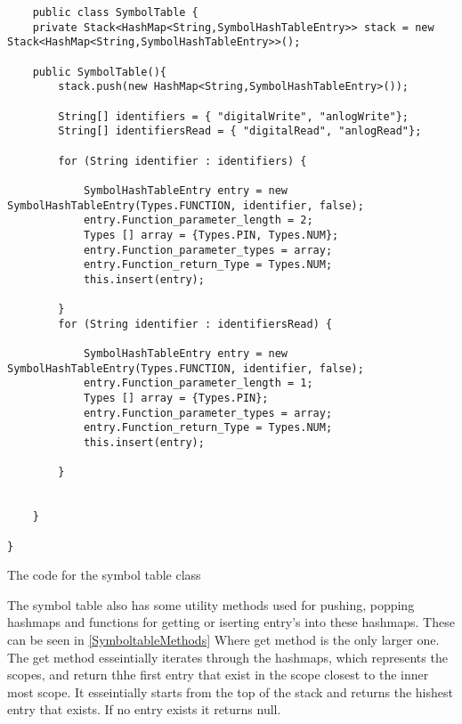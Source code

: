 \begin{listing}[htb!]
    \begin{verbatim}
    public class SymbolTable {
    private Stack<HashMap<String,SymbolHashTableEntry>> stack = new Stack<HashMap<String,SymbolHashTableEntry>>();
    
    public SymbolTable(){
        stack.push(new HashMap<String,SymbolHashTableEntry>());
        
        String[] identifiers = { "digitalWrite", "anlogWrite"};
        String[] identifiersRead = { "digitalRead", "anlogRead"};

        for (String identifier : identifiers) {
            
            SymbolHashTableEntry entry = new SymbolHashTableEntry(Types.FUNCTION, identifier, false);
            entry.Function_parameter_length = 2;
            Types [] array = {Types.PIN, Types.NUM};
            entry.Function_parameter_types = array;
            entry.Function_return_Type = Types.NUM;
            this.insert(entry);
            
        }
        for (String identifier : identifiersRead) {
            
            SymbolHashTableEntry entry = new SymbolHashTableEntry(Types.FUNCTION, identifier, false);
            entry.Function_parameter_length = 1;
            Types [] array = {Types.PIN};
            entry.Function_parameter_types = array;
            entry.Function_return_Type = Types.NUM;
            this.insert(entry);
            
        }


    }

}
\end{verbatim}
\caption{The code for the symbol table class}
\label{lst:SymbolTable}
\end{listing}

The symbol table also has some utility methods used for pushing, popping hashmaps and functions for getting or iserting entry's into these hashmaps. These can be seen in \ref{SymboltableMethods} Where get method is the only larger one. The get method esseintially iterates through the hashmaps, which represents the scopes, and return thhe first entry that exist in the scope closest to the inner most scope. It esseintially starts from the top of the stack and returns the hishest entry that exists. If no entry exists it returns null.


